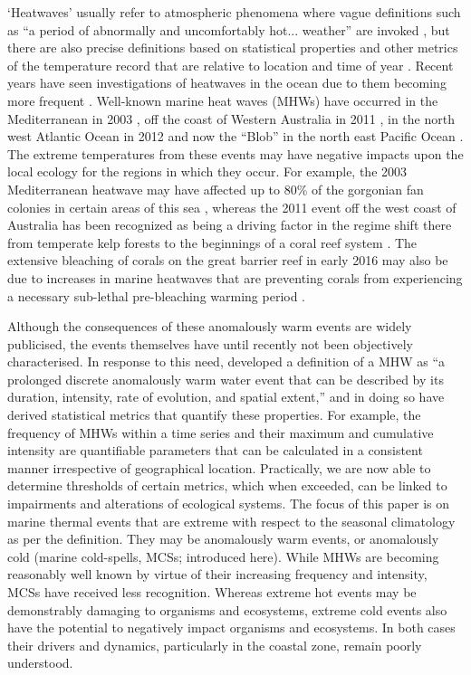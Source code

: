 \documentclass[a4paper,10pt,review]{elsarticle}
\begin{document}
`Heatwaves' usually refer to atmospheric phenomena where vague definitions such as ``a period of abnormally and uncomfortably hot... weather'' are invoked \citep{Glickman2000}, but there are also precise definitions based on statistical properties and other metrics of the temperature record that are relative to location and time of year \citep[e.g.][]{Meehl2004, Alexander2006, Fischer2010, Fischer2011, Perkins2013}. Recent years have seen investigations of heatwaves in the ocean due to them becoming more frequent \citep[e.g.][]{Mackenzie2007, Selig2010, Sura2011, Lima2012, DeCastro2014}. Well-known marine heat waves (MHWs) have occurred in the Mediterranean in 2003 \citep{Black2004, Olita2007, Garrabou2009}, off the coast of Western Australia in 2011 \citep{Feng2013, Pearce2013, Wernberg2013}, in the north west Atlantic Ocean in 2012 \citep{Mills2012, Chen2014, Chen2015} and now the ``Blob'' in the north east Pacific Ocean \citep{Bond2015}. The extreme temperatures from these events may have negative impacts upon the local ecology for the regions in which they occur. For example, the 2003 Mediterranean heatwave may have affected up to 80\% of the gorgonian fan colonies in certain areas of this sea \citep{Garrabou2009}, whereas the 2011 event off the west coast of Australia has been recognized as being a driving factor in the regime shift there from temperate kelp forests to the beginnings of a coral reef system \citep{Wernberg2013}. The extensive bleaching of corals on the great barrier reef in early 2016 may also be due to increases in marine heatwaves that are preventing corals from experiencing a necessary sub-lethal pre-bleaching warming period \citep{Ainsworth2016}.

Although the consequences of these anomalously warm events are widely publicised, the events themselves have until recently not been objectively characterised. In response to this need, \citet{Hobday2016} developed a definition of a MHW as ``a prolonged discrete anomalously warm water event that can be described by its duration, intensity, rate of evolution, and spatial extent,'' and in doing so have derived statistical metrics that quantify these properties. For example, the frequency of MHWs within a time series and their maximum and cumulative intensity are quantifiable parameters that can be calculated in a consistent manner irrespective of geographical location. Practically, we are now able to determine thresholds of certain metrics, which when exceeded, can be linked to impairments and alterations of ecological systems. The focus of this paper is on marine thermal events that are extreme with respect to the seasonal climatology as per the \citet{Hobday2016} definition. They may be anomalously warm events, or anomalously cold (marine cold-spells, MCSs; introduced here). While MHWs are becoming reasonably well known by virtue of their increasing frequency and intensity, MCSs have received less recognition. Whereas extreme hot events may be demonstrably damaging to organisms and ecosystems, extreme cold events also have the potential to negatively impact organisms and ecosystems. In both cases their drivers and dynamics, particularly in the coastal zone, remain poorly understood.
\end{document}
